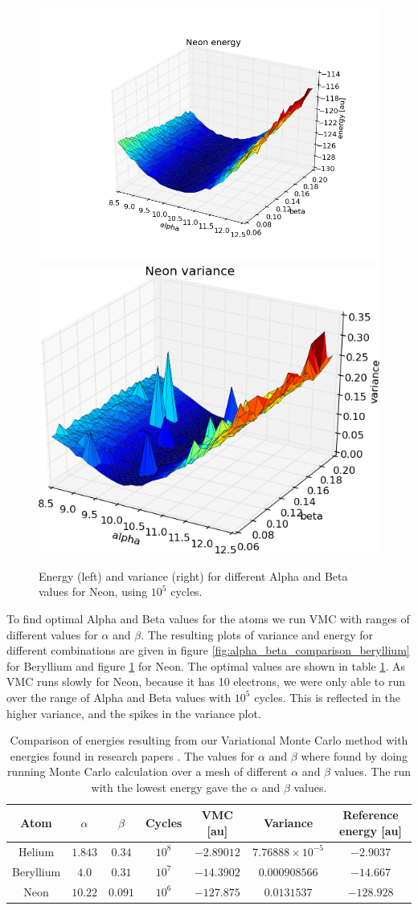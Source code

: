 		\begin{figure}
			\centering \includegraphics[width=0.45\linewidth]{../figures/Neon_alpha_beta_energy}
			\centering \includegraphics[width=0.45\linewidth]{../figures/Neon_alpha_beta_variance}
			\protect\caption{Energy (left) and variance (right) for different Alpha and Beta values for Neon, using $10^{5}$ cycles.}
			\label{fig:alpha_beta_comparison_neon}
		\end{figure}

		To find optimal Alpha and Beta values for the atoms we run VMC with ranges of different values for \(\alpha\) and \(\beta\). The resulting plots of variance and energy for different combinations are given in figure \ref{fig:alpha_beta_comparison_beryllium} for Beryllium and figure \ref{fig:alpha_beta_comparison_neon} for Neon. The optimal values are shown in table \ref{tab:EnergyAlphaBetaReference}. As VMC runs slowly for Neon, because it has 10 electrons, we were only able to run over the range of Alpha and Beta values with $10^{5}$ cycles. This is reflected in the higher variance, and the spikes in the variance plot.

		\begin{table}
			\center %
			\begin{tabular}{|c|c|c|c|c|c|c|}
				\hline 
				Atom  & $\alpha$ & $\beta$ & Cycles & VMC {[}au{]} & Variance & Reference energy {[}au{]} \tabularnewline
				\hline 
				Helium & $1.843$ & $0.34$ & $10^{8}$ & $-2.89012$ & $7.76888\times10^{-5}$ & $-2.9037$\tabularnewline
				\hline 
				Beryllium  & $4.0$ & $0.31$ & $10^{7}$ & $-14.3902$  & $0.000908566$ & $-14.667$ \tabularnewline
				\hline 
				Neon  & $10.22$ & $0.091$ & $10^{6}$ & $-127.875$ & $0.0131537$ & $-128.928$ \tabularnewline
				\hline 
			\end{tabular}\protect\caption{Comparison of energies resulting from our Variational Monte Carlo method with
			energies found in research papers \parencite{Koput_2011_PCCP} \parencite{Binkley_1975}. The values for \(\alpha\) and \( \beta \) where found by doing running Monte Carlo calculation over a mesh of different \(\alpha\) and \( \beta \) values. The run with the lowest energy gave the \(\alpha\) and \(\beta\) values.}
			\label{tab:EnergyAlphaBetaReference} 
		\end{table}


